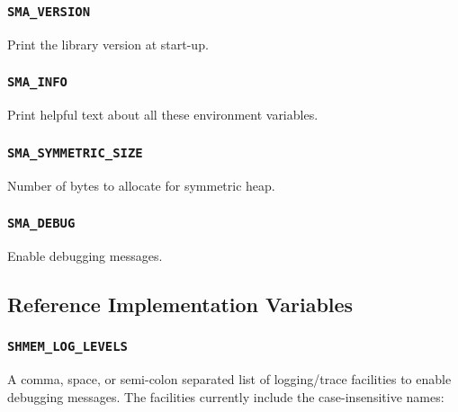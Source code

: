 \documentclass[english]{article}
\begin{document}
\subsubsection*{\texttt{SMA\_VERSION}}

Print the library version at start-up.

\subsubsection*{\texttt{SMA\_INFO}}

Print helpful text about all these environment variables.

\subsubsection*{\texttt{SMA\_SYMMETRIC\_SIZE}}

Number of bytes to allocate for symmetric heap.

\subsubsection*{\texttt{SMA\_DEBUG}}

Enable debugging messages.

\subsection{Reference Implementation Variables}

\subsubsection*{\texttt{SHMEM\_LOG\_LEVELS}}

A comma, space, or semi-colon separated list of logging/trace
facilities to enable debugging messages. The facilities currently
include the case-insensitive names:
\end{document}
